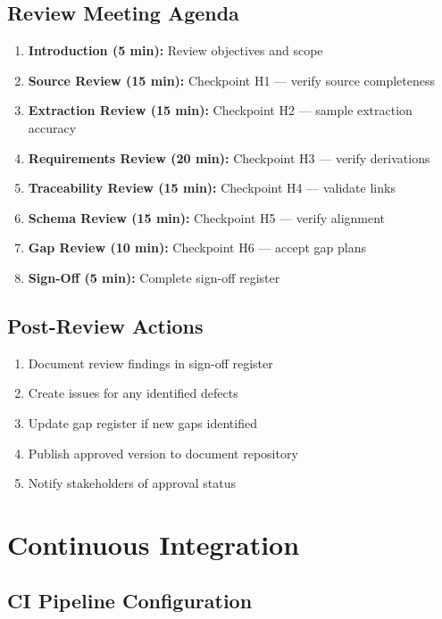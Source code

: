 \documentclass[11pt,a4paper,twoside]{report}
\begin{document}
\subsection{Review Meeting Agenda}

\begin{enumerate}
\item \textbf{Introduction (5 min):} Review objectives and scope
\item \textbf{Source Review (15 min):} Checkpoint H1 --- verify source completeness
\item \textbf{Extraction Review (15 min):} Checkpoint H2 --- sample extraction accuracy
\item \textbf{Requirements Review (20 min):} Checkpoint H3 --- verify derivations
\item \textbf{Traceability Review (15 min):} Checkpoint H4 --- validate links
\item \textbf{Schema Review (15 min):} Checkpoint H5 --- verify alignment
\item \textbf{Gap Review (10 min):} Checkpoint H6 --- accept gap plans
\item \textbf{Sign-Off (5 min):} Complete sign-off register
\end{enumerate}

\subsection{Post-Review Actions}

\begin{enumerate}
\item Document review findings in sign-off register
\item Create issues for any identified defects
\item Update gap register if new gaps identified
\item Publish approved version to document repository
\item Notify stakeholders of approval status
\end{enumerate}

\section{Continuous Integration}
\label{sec:ci-integration}

\subsection{CI Pipeline Configuration}
\end{document}
